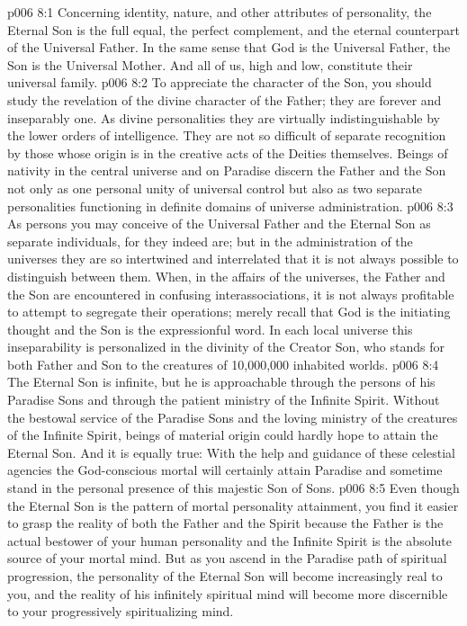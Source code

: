\vs p006 8:1 Concerning identity, nature, and other attributes of personality, the Eternal Son is the full equal, the perfect complement, and the eternal counterpart of the Universal Father. In the same sense that God is the Universal Father, the Son is the Universal Mother. And all of us, high and low, constitute their universal family.
\vs p006 8:2 To appreciate the character of the Son, you should study the revelation of the divine character of the Father; they are forever and inseparably one. As divine personalities they are virtually indistinguishable by the lower orders of intelligence. They are not so difficult of separate recognition by those whose origin is in the creative acts of the Deities themselves. Beings of nativity in the central universe and on Paradise discern the Father and the Son not only as one personal unity of universal control but also as two separate personalities functioning in definite domains of universe administration.
\vs p006 8:3 As persons you may conceive of the Universal Father and the Eternal Son as separate individuals, for they indeed are; but in the administration of the universes they are so intertwined and interrelated that it is not always possible to distinguish between them. When, in the affairs of the universes, the Father and the Son are encountered in confusing interassociations, it is not always profitable to attempt to segregate their operations; merely recall that God is the initiating thought and the Son is the expressionful word. In each local universe this inseparability is personalized in the divinity of the Creator Son, who stands for both Father and Son to the creatures of 10,000,000 inhabited worlds.
\vs p006 8:4 The Eternal Son is infinite, but he is approachable through the persons of his Paradise Sons and through the patient ministry of the Infinite Spirit. Without the bestowal service of the Paradise Sons and the loving ministry of the creatures of the Infinite Spirit, beings of material origin could hardly hope to attain the Eternal Son. And it is equally true: With the help and guidance of these celestial agencies the God\hyp{}conscious mortal will certainly attain Paradise and sometime stand in the personal presence of this majestic Son of Sons.
\vs p006 8:5 \pc Even though the Eternal Son is the pattern of mortal personality attainment, you find it easier to grasp the reality of both the Father and the Spirit because the Father is the actual bestower of your human personality and the Infinite Spirit is the absolute source of your mortal mind. But as you ascend in the Paradise path of spiritual progression, the personality of the Eternal Son will become increasingly real to you, and the reality of his infinitely spiritual mind will become more discernible to your progressively spiritualizing mind.

